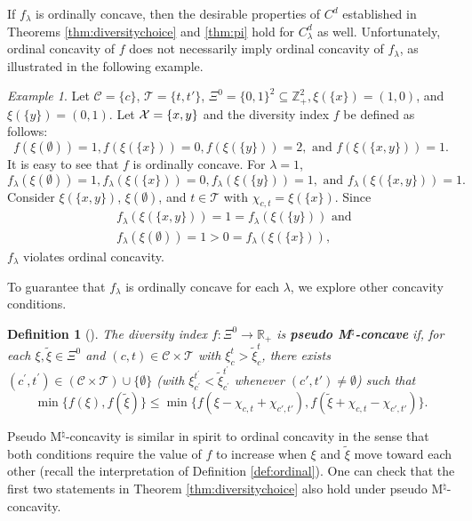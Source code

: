 \documentclass[12pt]{amsart}
\newtheorem{definition}{Definition}
\theoremstyle{remark}
\newtheorem{example}{Example}
\begin{document}
If $f_\lambda$ is ordinally concave, then the desirable properties of $C^d$ established in Theorems \ref{thm:diversitychoice} and \ref{thm:pi}
hold for $C_\lambda^d$ as well. Unfortunately, ordinal concavity of $f$ does not necessarily imply ordinal concavity of $f_\lambda$, as illustrated in the following example.

\begin{example}\label{ex:oc-truncation-fail}
Let $\mathcal{C}=\{c\}$, $\mathcal T=\{t,t'\}$, $\Xi^0=\{0,1\}^2 \subseteq \mathbb{Z}^2_+, \xi(\{x\})=(1,0)$, and $\xi(\{y\})=(0,1)$.
Let $\mathcal{X}=\{x,y\}$ and the diversity index $f$ be defined as follows:
\[f(\xi(\emptyset))=1, f(\xi(\{x\}))=0, f(\xi(\{y\}))=2, \mbox{ and } f(\xi(\{x,y\}))=1.\]
It is easy to see that $f$ is ordinally concave.
For $\lambda=1$,
\[f_\lambda(\xi(\emptyset))=1, f_\lambda(\xi(\{x\}))=0, f_\lambda(\xi(\{y\}))=1, \mbox{ and } f_\lambda(\xi(\{x,y\}))=1.\]
Consider $\xi(\{x,y\})$, $\xi(\emptyset)$, and $t \in \mathcal{T}$ with $\chi_{c,t}=\xi(\{x\})$. Since
\begin{align*}
&f_\lambda(\xi(\{x,y\}))=1=f_\lambda(\xi(\{y\})) \text{ and } \\
&f_\lambda(\xi(\emptyset))=1>0=f_\lambda(\xi(\{x\})),
\end{align*}
$f_\lambda$ violates ordinal concavity.
\end{example}
To guarantee that $f_\lambda$ is ordinally concave for each $\lambda$, we explore other concavity conditions.

\begin{definition}[\cite{hakoye2022}]\label{def:pseudo}
The diversity index $f: \Xi^0 \rightarrow \mathbb{R}_+$ is \textbf{pseudo M$^\natural$-concave} if, for each
$\xi, \tilde{\xi} \in \Xi^0$ and $(c, t) \in \mathcal{C} \times \mathcal{T}$ with $\xi_c^t>\tilde{\xi}_{c}^t$,
there exists $\left(c^{\prime}, t^{\prime}\right) \in (\mathcal{C} \times \mathcal{T})\cup\{\emptyset\}$ (with $\xi_{c^{\prime}}^{t^{\prime}}<\tilde{\xi}_{c^{\prime}}^{t^{\prime}}$ whenever $(c',t')\neq \emptyset$) such that
$$
\min\{f(\xi),f(\tilde{\xi})\}\leq\min\{f(\xi-\chi_{c,t}+\chi_{c',t'}), f(\tilde{\xi}+\chi_{c,t}-\chi_{c',t'})\}.
$$
\end{definition}
Pseudo M$^\natural$-concavity is similar in spirit to ordinal concavity in the sense that both conditions
require the value of $f$ to increase when $\xi$ and $\tilde \xi$ move toward each other (recall the interpretation of Definition \ref{def:ordinal}). One can check that
the first two statements in Theorem \ref{thm:diversitychoice} also hold under
pseudo M$^\natural$-concavity.
\end{document}
